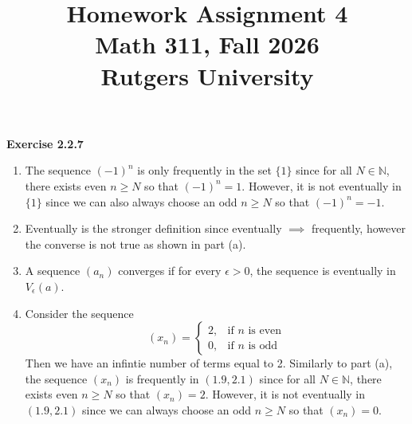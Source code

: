 \documentclass[12pt]{article}
\title{Homework Assignment 4 \\ \large Math 311, Fall 2026 \\ Rutgers University}
\author{}
\date{}
\begin{document}
\maketitle

\textbf{Exercise 2.2.7}
\begin{enumerate}[label=(\alph*)]
    \item The sequence \((-1)^n\) is only frequently in the set \(\{1\}\)
          since for all \(N \in \mathbb{N}\), there exists even \(n \geq N\) so that
          \((-1)^n = 1\). However, it is not eventually in \(\{1\}\) since
          we can also always choose an odd \(n \geq N\) so that \((-1)^n = -1\).
    \item Eventually is the stronger definition since eventually \(\implies \) frequently,
          however the converse is not true as shown in part (a).
    \item A sequence \((a_n)\) converges if for every \(\epsilon > 0 \), the sequence
          is eventually in \(V_{\epsilon}(a)\).
    \item Consider the sequence
          \[
              (x_n) = \begin{cases}
              2, & \text{if $n$ is even}   \\
              0, & \text{if $n$ is odd}
              \end{cases}
          \]
          Then we have an infintie number of terms equal to 2.
          Similarly to part (a), the sequence \((x_n)\) is frequently in \((1.9, 2.1)\)
          since for all \(N \in \mathbb{N}\), there exists even \(n \geq N\) so that
          \((x_n) = 2\). However, it is not eventually in \((1.9, 2.1)\) since
          we can always choose an odd \(n \geq N\) so that \((x_n) = 0\).
\end{enumerate}
\end{document}
